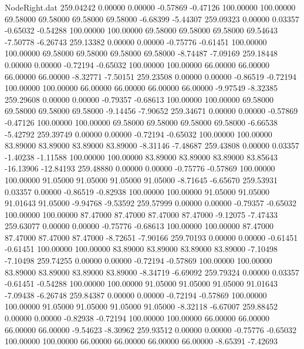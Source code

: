 \begin{filecontents}{NodeRight.dat}
 259.04242    0.00000    0.00000    -0.57869   -0.47126  100.00000  100.00000   69.58000   69.58000   69.58000   69.58000   -6.68399   -5.44307
 259.09323    0.00000    0.03357    -0.65032   -0.54288  100.00000  100.00000   69.58000   69.58000   69.58000   69.54643   -7.50778   -6.26743
 259.13382    0.00000    0.00000    -0.75776   -0.61451  100.00000  100.00000   69.58000   69.58000   69.58000   69.58000   -8.74487   -7.09169
 259.18448    0.00000    0.00000    -0.72194   -0.65032  100.00000  100.00000   66.00000   66.00000   66.00000   66.00000   -8.32771   -7.50151
 259.23508    0.00000    0.00000    -0.86519   -0.72194  100.00000  100.00000   66.00000   66.00000   66.00000   66.00000   -9.97549   -8.32385
 259.29608    0.00000    0.00000    -0.79357   -0.68613  100.00000  100.00000   69.58000   69.58000   69.58000   69.58000   -9.14456   -7.90652
 259.34671    0.00000    0.00000    -0.57869   -0.47126  100.00000  100.00000   69.58000   69.58000   69.58000   69.58000   -6.66538   -5.42792
 259.39749    0.00000    0.00000    -0.72194   -0.65032  100.00000  100.00000   83.89000   83.89000   83.89000   83.89000   -8.31146   -7.48687
 259.43808    0.00000    0.03357    -1.40238   -1.11588  100.00000  100.00000   83.89000   83.89000   83.89000   83.85643  -16.13906  -12.84193
 259.48880    0.00000    0.00000    -0.75776   -0.57869  100.00000  100.00000   91.05000   91.05000   91.05000   91.05000   -8.71645   -6.65670
 259.53931    0.03357    0.00000    -0.86519   -0.82938  100.00000  100.00000   91.05000   91.05000   91.01643   91.05000   -9.94768   -9.53592
 259.57999    0.00000    0.00000    -0.79357   -0.65032  100.00000  100.00000   87.47000   87.47000   87.47000   87.47000   -9.12075   -7.47433
 259.63077    0.00000    0.00000    -0.75776   -0.68613  100.00000  100.00000   87.47000   87.47000   87.47000   87.47000   -8.72651   -7.90166
 259.70193    0.00000    0.00000    -0.61451   -0.61451  100.00000  100.00000   83.89000   83.89000   83.89000   83.89000   -7.10498   -7.10498
 259.74255    0.00000    0.00000    -0.72194   -0.57869  100.00000  100.00000   83.89000   83.89000   83.89000   83.89000   -8.34719   -6.69092
 259.79324    0.00000    0.03357    -0.61451   -0.54288  100.00000  100.00000   91.05000   91.05000   91.05000   91.01643   -7.09438   -6.26748
 259.84387    0.00000    0.00000    -0.72194   -0.57869  100.00000  100.00000   91.05000   91.05000   91.05000   91.05000   -8.32118   -6.67007
 259.88452    0.00000    0.00000    -0.82938   -0.72194  100.00000  100.00000   66.00000   66.00000   66.00000   66.00000   -9.54623   -8.30962
 259.93512    0.00000    0.00000    -0.75776   -0.65032  100.00000  100.00000   66.00000   66.00000   66.00000   66.00000   -8.65391   -7.42693

\end{filecontents}
